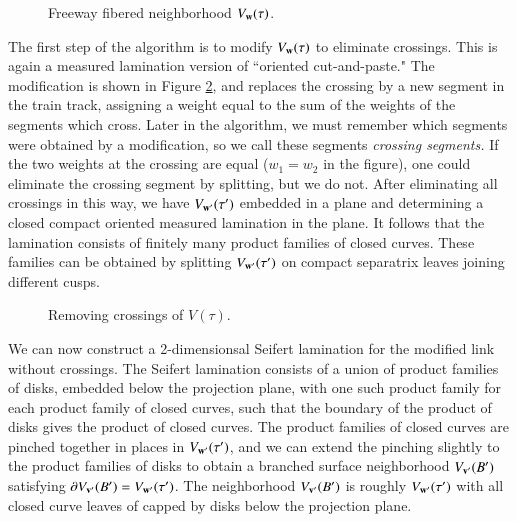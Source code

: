 \documentclass[12pt]{article}
\theoremstyle{remark}
\begin{document}
\begin{figure}[H]
\centering
{}
\caption{\footnotesize Freeway fibered neighborhood $V_{\bf w}(\tau)$.}
\label{Freeway}
\end{figure}


The first step of the algorithm is to modify $V_{\bf w}(\tau)$ to eliminate crossings.   This is again a measured lamination version of  ``oriented cut-and-paste."  The modification is shown in Figure \ref{CrossingRemove}, and replaces the crossing by a new segment in the train track, assigning a weight equal to the sum of the weights of the segments which cross.  Later in the algorithm, we must remember which segments were obtained by a modification, so we call these segments {\it crossing segments.}  If the two weights at the crossing are equal ($w_1=w_2$ in the figure), one could eliminate the crossing segment by splitting, but we do not.  After eliminating all crossings in this way, we have $V_{{\bf w}'}(\tau')$ embedded in a plane and determining a closed compact oriented measured lamination in the plane.  It follows that the lamination consists of finitely many product families of closed curves.   These families can be obtained by splitting $V_{{\bf w}'}(\tau')$ on compact separatrix leaves joining different cusps.  




\begin{figure}[ht]
\centering
{}
\caption{\footnotesize Removing crossings of $V(\tau)$.}
\label{CrossingRemove}
\end{figure}


 We can now construct a 2-dimensionsal Seifert lamination for the modified link without crossings.  The Seifert lamination consists of a union of product families of disks, embedded below the projection plane, with one such product family for each product family of closed curves, such that the boundary of the product of disks gives the product of closed curves.   The product families of closed curves are pinched together in places in $V_{{\bf w}'}(\tau')$, and we can extend the pinching slightly to the product families of disks to obtain a branched surface neighborhood $V_{{\bf v}'}(B')$ satisfying $\partial V_{{\bf v}'}(B')=V_{{\bf w}'}(\tau')$.  The neighborhood $V_{{\bf v}'}(B')$ is roughly $V_{{\bf w}'}(\tau')$ with all closed curve leaves of capped by disks below the projection plane.
 
\end{document}
